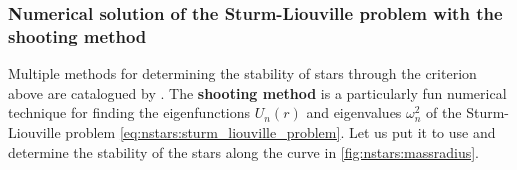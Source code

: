 

\subsubsection{Numerical solution of the Sturm-Liouville problem with the shooting method}

Multiple methods for determining the stability of stars through the criterion above are catalogued by \cite{ref:stability_methods}.
The \textbf{shooting method} is a particularly fun numerical technique for finding the eigenfunctions $U_n(r)$ and eigenvalues $\omega_n^2$ of the Sturm-Liouville problem \eqref{eq:nstars:sturm_liouville_problem}.
Let us put it to use and determine the stability of the stars along the curve in \cref{fig:nstars:massradius}.

